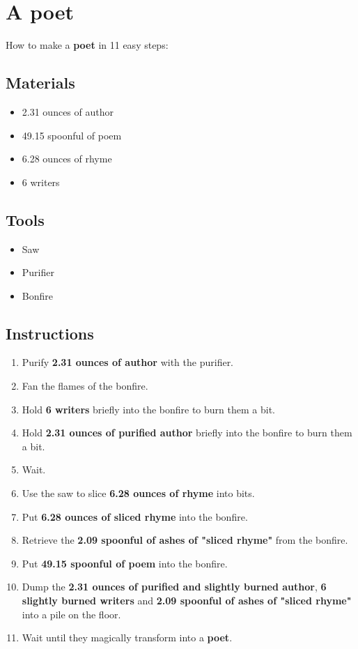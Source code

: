 \documentclass{article}
\begin{document}
\section{A poet}How to make a \textbf{poet} in 11 easy steps:

\subsection{Materials}\begin{itemize}
\item 
2.31 ounces of author
\item 
49.15 spoonful of poem
\item 
6.28 ounces of rhyme
\item 
6 writers
\end{itemize}
\subsection{Tools}\begin{itemize}
\item 
Saw
\item 
Purifier
\item 
Bonfire
\end{itemize}
\subsection{Instructions}\begin{enumerate}
\item 
Purify \textbf{2.31 ounces of author} with the purifier.
\item 
Fan the flames of the bonfire.
\item 
Hold \textbf{6 writers} briefly into the bonfire to burn them a bit.
\item 
Hold \textbf{2.31 ounces of purified author} briefly into the bonfire to burn them a bit.
\item 
Wait.
\item 
Use the saw to slice \textbf{6.28 ounces of rhyme} into bits.
\item 
Put \textbf{6.28 ounces of sliced rhyme} into the bonfire.
\item 
Retrieve the \textbf{2.09 spoonful of ashes of "sliced rhyme"} from the bonfire.
\item 
Put \textbf{49.15 spoonful of poem} into the bonfire.
\item 
Dump the \textbf{2.31 ounces of purified and slightly burned author}, \textbf{6 slightly burned writers} and \textbf{2.09 spoonful of ashes of "sliced rhyme"} into a pile on the floor.
\item 
Wait until they magically transform into a \textbf{poet}.
\end{enumerate}
\newpage
\end{document}
